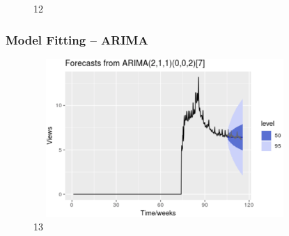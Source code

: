 \documentclass[cjk,10pt]{beamer}
\begin{document}
\begin{CJK*}{GBK}{song}
\begin{frame}
\begin{figure}[htbp]
\caption{12}
\end{figure}
       \end{frame}
    \begin{frame}
    \frametitle{Model Fitting -- ARIMA}
    \begin{figure}[htbp]
\centering
\includegraphics[height=6cm, width=10cm]{13}
\caption{13}
\end{figure}
       \end{frame}    

\end{CJK*}
\end{document}

